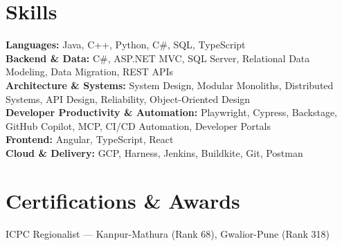 \documentclass[10pt,a4paper]{moderncv}
\begin{document}
\section{Skills}
\textbf{Languages:} Java, C++, Python, C\#, SQL, TypeScript \\
\textbf{Backend \& Data:} C\#, ASP.NET MVC, SQL Server, Relational Data Modeling, Data Migration, REST APIs \\
\textbf{Architecture \& Systems:} System Design, Modular Monoliths, Distributed Systems, API Design, Reliability, Object-Oriented Design \\
\textbf{Developer Productivity \& Automation:} Playwright, Cypress, Backstage, GitHub Copilot, MCP, CI/CD Automation, Developer Portals \\
\textbf{Frontend:} Angular, TypeScript, React \\
\textbf{Cloud \& Delivery:} GCP, Harness, Jenkins, Buildkite, Git, Postman
\section{Certifications \& Awards}
ICPC Regionalist --- Kanpur-Mathura (Rank 68), Gwalior-Pune (Rank 318)
\end{document}
